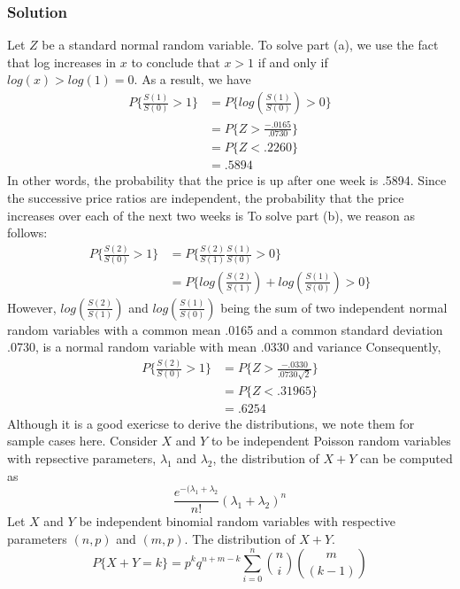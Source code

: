\subsubsection*{Solution}
Let $Z$ be a standard normal random variable. To solve part (a), we use the fact that log increases in $x$ to conclude that $x > 1$ if and only if $log(x) > log(1) = 0$. As a result, we have
\begin{equation*}
    \begin{split}
        P\{\frac{S(1)}{S(0)} > 1\} &= P\{log\left(\frac{S(1)}{S(0)}\right) > 0\}\\
        &= P\{Z > \frac{-.0165}{.0730}\}\\
        &= P\{Z < .2260\}\\
        &= .5894
    \end{split}
\end{equation*}
In other words, the probability that the price is up after one week is .5894. Since
the successive price ratios are independent, the probability that the price
increases over each of the next two weeks is
To solve part (b), we reason as follows:
\begin{equation*}
    \begin{split}
        P\{\frac{S(2)}{S(0)} > 1\} &= P\{\frac{S(2)}{S(1)}\frac{S(1)}{S(0)} > 0\}\\
        &= P\{log\left(\frac{S(2)}{S(1)}\right) + log\left(\frac{S(1)}{S(0)}\right) > 0\}
    \end{split}
\end{equation*}
However, $log\left(\frac{S(2)}{S(1)}\right)$ and $log\left(\frac{S(1)}{S(0)}\right)$ being the sum of two independent normal
random variables with a common mean .0165 and a common standard deviation
.0730, is a normal random variable with mean .0330 and variance
Consequently,
\begin{equation*}
    \begin{split}
         P\{\frac{S(2)}{S(0)} > 1\} &= P\{Z > \frac{-.0330}{.0730\sqrt{2}}\}\\
         &= P\{Z < .31965\}\\
         &= .6254
    \end{split}
\end{equation*}
Although it is a good exericse to derive the distributions, we note them for sample cases here. Consider $X$ and $Y$ to be independent Poisson random variables with repsective parameters, $\lambda_1$ and $\lambda_2$, the distribution of $X + Y$ can be computed as \[\frac{e^{-(\lambda_1 + \lambda_2}}{n!}(\lambda_1 + \lambda_2)^n\]
Let $X$ and $Y$ be independent binomial random variables with respective parameters $(n,p)$ and $(m,p)$. The distribution of $X + Y$. \[P\{X + Y = k\} = p^kq^{n+m-k}\sum^n_{i = 0} {n\choose i}{m\choose (k-1)}\]
